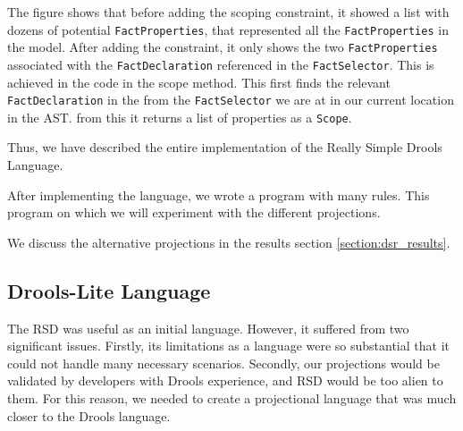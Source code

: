 The figure shows that before adding the scoping constraint, it showed a list with dozens of potential \texttt{FactProperties}, that represented all the \linebreak\texttt{FactProperties} in the model.
After adding the constraint, it only shows the two \texttt{FactProperties} associated with the \texttt{FactDeclaration} referenced in the \texttt{FactSelector}.
This is achieved in the code in the scope method.
This first finds the relevant \texttt{FactDeclaration} in the from the \texttt{FactSelector} we are at in our current location in the AST.
from this it returns a list of properties as a \texttt{Scope}.

Thus, we have described the entire implementation of the Really Simple Drools Language.

After implementing the language, we wrote a program with many rules.
This program on which we will experiment with the different projections.

We discuss the alternative projections in the results section \ref{section:dsr_results}.

\newpage
\subsection{Drools-Lite Language}
\label{section:DroolsLite}

The RSD was useful as an initial language. 
However, it suffered from two significant issues.
Firstly, its limitations as a language were so substantial that it could not handle many necessary scenarios.
Secondly, our projections would be validated by developers with Drools experience, and RSD would be too alien to them.
For this reason, we needed to create a projectional language that was much closer to the Drools language.

